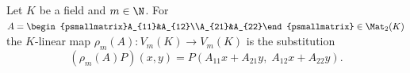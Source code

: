 Let $K$ be a field and $m\in\N$. For $A=\begin{psmallmatrix}A_{11}&A_{12}\\A_{21}&A_{22}\end{psmallmatrix}\in\Mat_2(K)$ the $K$-linear map
$\rho_m(A)\colon V_m(K)\to V_m(K)$ is the substitution
\[
  (\rho_m(A)P)(x,y)=P(A_{11}x+A_{21}y,\;A_{12}x+A_{22}y).
\]
